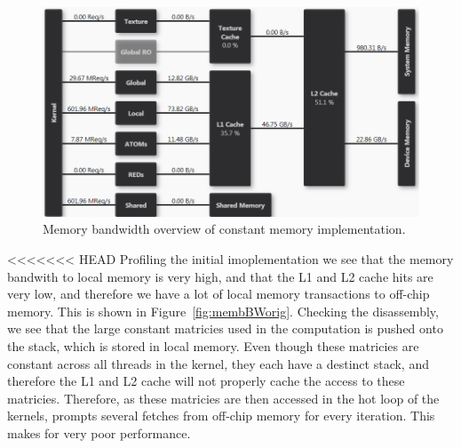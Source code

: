 \documentclass[11pt, oneside, a4paper]{article}
\begin{document}
\begin{figure}[tb]
	\begin{center}
		\includegraphics[width=\textwidth]{"LHS memory overview BW"}
	\end{center}
	\caption{Memory bandwidth overview of constant memory implementation.}
	\label{fig:membBWfinal}
\end{figure}

<<<<<<< HEAD
Profiling the initial imoplementation we see that the memory bandwith to local memory is very high, and that the L1 and L2 cache hits are very low, and therefore we have a lot of local memory transactions to off-chip memory. This is shown in Figure~\ref{fig:membBWorig}.
Checking the disassembly, we see that the large constant matricies used in the computation is pushed onto the stack, which is stored in local memory.
Even though these matricies are constant across all threads in the kernel, they each have a destinct stack, and therefore the L1 and L2 cache will not properly cache the access to these matricies.
Therefore, as these matricies are then accessed in the hot loop of the kernels, prompts several fetches from off-chip memory for every iteration. This makes for very poor performance.
\end{document}
